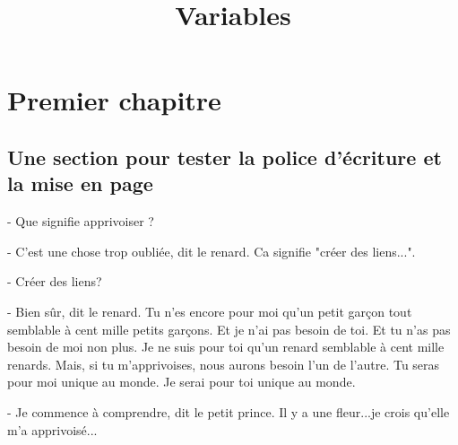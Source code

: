 \documentclass[
    paper=A4,
    fontsize=12pt, %
    parskip=half-, %
    twoside=true
]{scrreprt} %
\title{Variables}
\author{}
\begin{document}
\maketitle
\chapter{Premier chapitre}
\section{Une section pour tester la police d'écriture et la mise en page}
- Que signifie \og apprivoiser \fg?

- C'est une chose trop oubliée, dit le renard.  Ca signifie "créer des liens...".

- Créer des liens?

- Bien sûr, dit le renard.  Tu n'es encore pour moi qu'un petit garçon tout semblable à cent mille petits garçons.  Et je n'ai pas besoin de toi.  Et tu n'as pas besoin de moi non plus.  Je ne suis pour toi qu'un renard semblable à cent mille renards.  Mais, si tu m'apprivoises, nous aurons besoin l'un de l'autre.  Tu seras pour moi unique au monde.  Je serai pour toi unique au monde.

- Je commence à comprendre, dit le petit prince.  Il y a une fleur...je crois qu'elle m'a apprivoisé...
\end{document}
